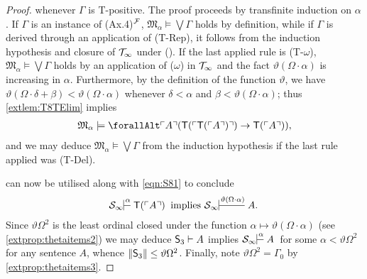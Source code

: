 \documentclass[UKenglish,cleveref,DIV=12]{scrartcl}
\let\forall\forallAlt
\theoremstyle{definition}
\theoremstyle{definition}
\begin{document}
\begin{proof}
whenever $\Gamma$ is T-positive. The
proof proceeds by transfinite induction on $\alpha$. If $\Gamma$ is an instance
of (Ax.4)$^{\mathcal{F}}$, $\mathfrak{M}_\alpha\models\bigvee\Gamma$ holds by definition,
while if $\Gamma$ is derived through an application of (T-Rep), it follows from
the induction hypothesis and closure of $\mathcal{T}_\infty$ under (). If the last applied rule is (T-$\omega$), $\mathfrak{M}_\alpha\models\bigvee\Gamma$ holds by an application of
($\omega$) in $\mathcal{T}_\infty$ and the fact $\vartheta(\Omega\cdot\alpha)$ is increasing in $\alpha$.
Furthermore, by the definition of the function $\vartheta$, we have
$\vartheta(\Omega\cdot\delta+\beta)<\vartheta(\Omega\cdot\alpha)$ whenever
$\delta<\alpha$ and $\beta<\vartheta(\Omega\cdot\alpha)$; thus
\cref{extlem:T8TElim} implies
\begin{align*}
  \mathfrak{M}_\alpha\models\forall\gn A(\T(\gn{\T(\gn A)})\rightarrow \T(\gn A)),
\end{align*}
and we may deduce $\mathfrak{M}_\alpha\models\bigvee\Gamma$ from the induction
hypothesis if the last rule applied was (T-Del).

 can now be utilised along with \cref{eqn:S81} to conclude
\begin{align*}%
 \theoryinf S\prov\alpha{}{\T(\gn A)}\text{ implies }\theoryinf
S\prov{\vartheta(\Omega\cdot\alpha)}{} {A.}
\end{align*}
Since $\vartheta\Omega^2$ is the least ordinal closed under the function
$\alpha\mapsto\vartheta(\Omega\cdot\alpha)$ (see \cref{extprop:thetaitems2}) we
may deduce $\mathsf{S}_3\vdash A$ implies $\theoryinf S\prov\alpha{}A$ for
some $\alpha<\vartheta\Omega^2$ for any sentence $A$, whence $\lVert{\mathsf{S}_3}\rVert\le\vartheta\Omega^2$. Finally, note $\vartheta\Omega^2=\Gamma_0$
by \cref{extprop:thetaitems3}.
\end{proof}
\end{document}
